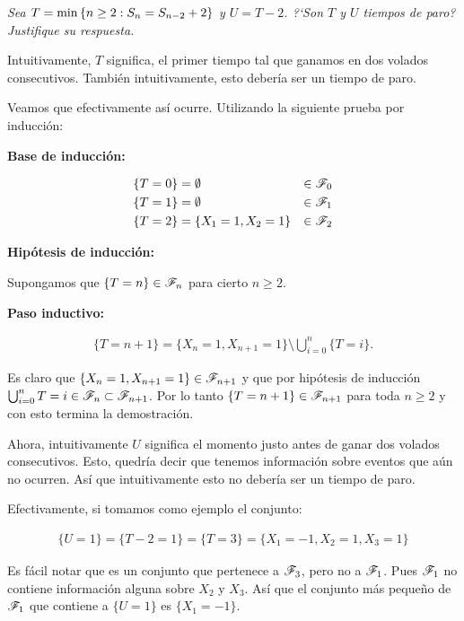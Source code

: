 \emph
{
	Sea $T=\min\left\{ n\geq 2:S_n=S_{n-2} + 2\right\} $ y $U=T-2$. ?`Son $T$ y $U$ 
	tiempos de paro? Justifique su respuesta.
}\par\null

\afterstatement

	Intuitivamente, $T$ significa, el primer tiempo tal que ganamos en dos volados consecutivos.
	También intuitivamente, esto debería ser un tiempo de paro.\par\null
	
	Veamos que efectivamente así ocurre. Utilizando la siguiente prueba por inducción:\par\null
	
	\textbf{Base de inducción:}\par\null		
    
		\begin{align}
			\{T = 0\} 		&= \emptyset  				& 	\in \mathscr{F}_0 \\
			\{T = 1\} 		&= \emptyset  				& 	\in \mathscr{F}_1 \\
			\{T = 2\} 		&= \{ X_1 = 1, X_2 = 1\} 	&	\in \mathscr{F}_2
		\end{align}\par\null					
	
	\textbf{Hipótesis de inducción:}\par\null
	
		Supongamos que $\{T = n\} \in \mathscr{F}_n$ para cierto $n \geq 2$.\par\null
		
	\textbf{Paso inductivo:}\par\null
		
		\begin{align}
			\{T = n + 1 \} = \{ X_n = 1, X_{n+1} = 1\} \setminus \bigcup_{i=0}^{n} \{T = i\}.
		\end{align}\par\null				
	
		Es claro que $\{ X_n = 1, X_{n+1} = 1\} \in \mathscr{F}_{n + 1}$ y que por hipótesis de inducción
		$\bigcup_{i=0}^{n} {T = i} \in \mathscr{F}_n \subset \mathscr{F}_{n + 1}$. Por lo tanto
		$\{T = n + 1 \} \in \mathscr{F}_{n+1}$ para toda $n \geq 2$ y con esto termina la demostración.\par\null
		
	Ahora, intuitivamente $U$ significa el momento justo antes de ganar dos volados consecutivos.
	Esto, quedría decir que tenemos información sobre eventos que aún no ocurren. Así que intuitivamente
	esto no debería ser un tiempo de paro.\par\null
	
	Efectivamente, si tomamos como ejemplo el conjunto: 

    \begin{align}
        \{ U = 1 \} = \{ T - 2 = 1\} = \{ T = 3\} = \{X_1 = -1, X_2 = 1, X_3 = 1\}
    \end{align}\par\null
			
	Es fácil notar que es un conjunto que pertenece a $\mathscr{F}_3$, pero no a $\mathscr{F}_1$. Pues $\mathscr{F}_1$
	no contiene información alguna sobre $X_2$ y $X_3$. Así que el conjunto más pequeño de $\mathscr{F}_1$ 
	que contiene a $\{ U = 1 \}$ es $\{ X_1 = -1 \}$.
